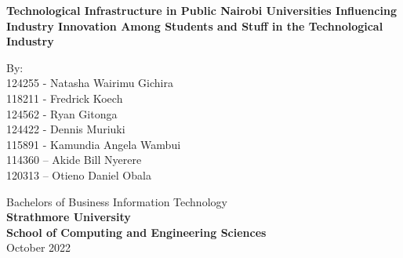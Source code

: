 \begin{titlepage}
    \begin{center}
        \vspace*{1cm}
            
        \Large
        \textbf{Technological Infrastructure in Public Nairobi Universities Influencing Industry Innovation Among Students and Stuff in the Technological Industry}
            
        \vspace{0.5cm}
        \Large{By:\\ 124255 - Natasha Wairimu Gichira\\ 118211 - Fredrick Koech\\ 124562 - Ryan Gitonga\\  124422 - Dennis Muriuki\\ 115891 - Kamundia Angela Wambui\\ 114360 – Akide Bill Nyerere\\ 120313 – Otieno Daniel Obala}
            
        \vspace{1.5cm}
   
        \Large
        Bachelors of Business Information Technology\\
        \textbf {Strathmore University}\\
        \textbf {School of Computing and Engineering Sciences}\\
        October 2022 
            
    \end{center}
\end{titlepage}